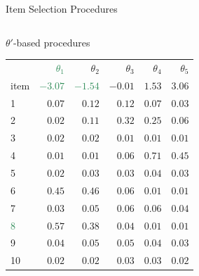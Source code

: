 \documentclass[final,t]{beamer}
\begin{document}
\begin{frame}
\begin{columns}[t]
\begin{column}{.45\linewidth}
\begin{block}{\centering Item Selection Procedures}
\begin{columns}
					\begin{column}{.50\linewidth}
						\centering $\theta'$-based procedures
						\begin{table}[ht]
							\centering
							\begin{tabular}{lrrrrr}
								\hline
								  & \textcolor{seagreen}{$\theta_1 $} & \textcolor{royalblue3}{$\theta_2 $} & \textcolor{template}{$\theta_3$} & \textcolor{typical}{$\theta_4$}& \textcolor{comp}{$\theta_5$ }\\ 
								 item			& \textcolor{seagreen}{$	-3.07	$} & \textcolor{seagreen}{$	-1.54	$ }& \textcolor{template}{$	-0.01	$} & \textcolor{typical}{$	1.53	$} & \textcolor{comp}{$	3.06	$} \\
								\hline
						1	& $	0.07	$ & $	0.12	$ & $	0.12	$ & $	0.07	$ & $	0.03	$ \\
				\textcolor{template}{2}	& $	0.02	$ & $	0.11	$ & \cellcolor{template!20!}$	0.32	$ & $	0.25	$ & $	0.06	$ \\
						3	& $	0.02	$ & $	0.02	$ & $	0.01	$ & $	0.01	$ & $	0.01	$ \\
						\textcolor{typical}{4}	& $	0.01	$ & $	0.01	$ & $	0.06	$ & 	\cellcolor{template!20!}$	0.71	$ & $	0.45	$ \\
						5	& $	0.02	$ & $	0.03	$ & $	0.03	$ & $	0.04	$ & $	0.03	$ \\
						\textcolor{royalblue3}{6}	& $	0.45	$ & \cellcolor{template!20!}$	0.46	$ & $	0.06	$ & $	0.01	$ & $	0.01	$ \\
						\textcolor{comp}{7}	& $	0.03	$ & $	0.05	$ & $	0.06	$ & $	0.06	$ & \cellcolor{template!20!}$	0.04	$ \\
						\textcolor{seagreen}{8}	& \cellcolor{template!20!}$0.57	$ & $	0.38	$ & $	0.04	$ & $	0.01	$ & $	0.01	$ \\
						9	& $	0.04	$ & $	0.05	$ & $	0.05	$ & $	0.04	$ & $	0.03	$ \\
						10	& $	0.02	$ & $	0.02	$ & $	0.03	$ & $	0.03	$ & $	0.02	$ \\
						\hline
			
						
							
							\end{tabular}
						\end{table}
					\end{column}
					\end{columns}
					
				
				\end{block}
				
			
			
				
			\end{column}
			

\end{columns}
\end{frame}
\end{document}
